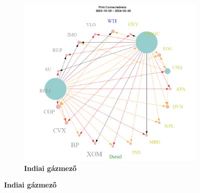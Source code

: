 \documentclass[12pt,bibliography=totoc]{article}
\begin{document}
\begin{figure}[H]
\centering
\caption{Olajipari sokkok, mikro szinten}
\begin{subfigure}{.5\linewidth}
\centering
\includegraphics[width=\linewidth]{reli}
\caption{\textbf{Indiai gázmező}}


\end{subfigure}
\end{figure}
\end{document}
